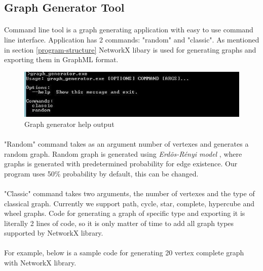 \documentclass[a4paper,TexShade]{class}
\begin{document}
\bigskip
\subsection{Graph Generator Tool} \label{graph-generator}

\paragraph{} Command line tool is a graph generating application with easy to use command line interface. Application has 2 commands: "random" and "classic". As mentioned in section \ref{program-structure} NetworkX libary is used for generating graphs and exporting them in GraphML format. 

\bigskip
\begin{figure}[h]
\centering
\caption{Graph generator help output} \label{generator1}
\includegraphics[width=0.9\linewidth ,natwidth=569,natheight=120]{images/generator_screen1.png}
\end{figure}

\paragraph{} "Random" command takes as an argument number of vertexes and generates a random graph. Random graph is generated using \textit{Erd\~{o}s-R\'{e}nyi model} \cite{erdos-renyi}, where graphs is generated with predetermined probability for edge existence. Our program uses 50\% probability by default, this can be changed.

\paragraph{} "Classic" command takes two arguments, the number of vertexes and the type of classical graph. Currently we support path, cycle, star, complete, hypercube and wheel graphs. Code for generating a graph of specific type and exporting it is literally 2 lines of code, so it is only matter of time to add all graph types supported by NetworkX library.

\paragraph{} For example, below is a sample code for generating 20 vertex complete graph with NetworkX library.
\bigskip
\end{document}
